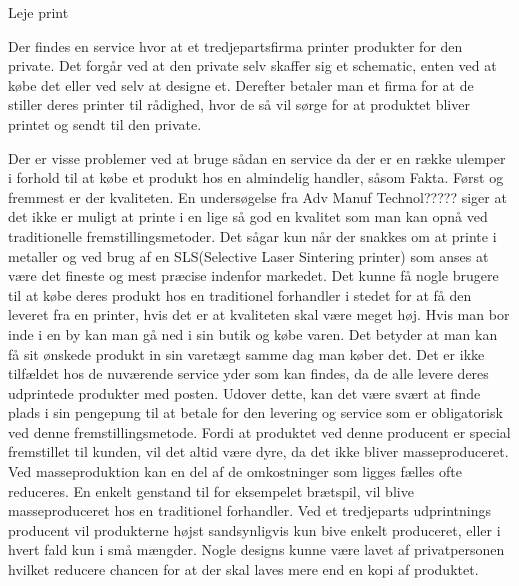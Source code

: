 Leje print

Der findes en service hvor at et tredjepartsfirma printer produkter for den private. Det forgår ved at den private selv skaffer sig et schematic, enten ved at købe det eller ved selv at designe et. Derefter betaler man et firma for at de stiller deres printer til rådighed, hvor de så vil sørge for at produktet bliver printet og sendt til den private.

Der er visse problemer ved at bruge sådan en service da der er en række ulemper i forhold til at købe et produkt hos en almindelig handler, såsom Fakta. Først og fremmest er der kvaliteten. En undersøgelse fra Adv Manuf Technol????? siger at det ikke er muligt at printe i en lige så god en kvalitet som man kan opnå ved traditionelle fremstillingsmetoder. Det sågar kun når der snakkes om at printe i metaller og ved brug af en SLS(Selective Laser Sintering printer) som anses at være det fineste og mest præcise indenfor markedet. Det kunne få nogle brugere til at købe deres produkt hos en traditionel forhandler i stedet for at få den leveret fra en printer, hvis det er at kvaliteten skal være meget høj.
Hvis man bor inde i en by kan man gå ned i sin butik og købe varen. Det betyder at man kan få sit ønskede produkt in sin varetægt samme dag man køber det. Det er ikke tilfældet hos de nuværende service yder som kan findes, da de alle levere deres udprintede produkter med posten.
Udover dette, kan det være svært at finde plads i sin pengepung til at betale for den levering og service som er obligatorisk ved denne fremstillingsmetode. Fordi at produktet ved denne producent er special fremstillet til kunden, vil det altid være dyre, da det ikke bliver masseproduceret. Ved masseproduktion kan en del af de omkostninger som ligges fælles ofte reduceres. En enkelt genstand til for eksempelet brætspil, vil blive masseproduceret hos en traditionel forhandler. Ved et tredjeparts udprintnings producent vil produkterne højst sandsynligvis kun bive enkelt produceret, eller i hvert fald kun i små mængder. Nogle designs kunne være lavet af privatpersonen hvilket reducere chancen for at der skal laves mere end en kopi af produktet.